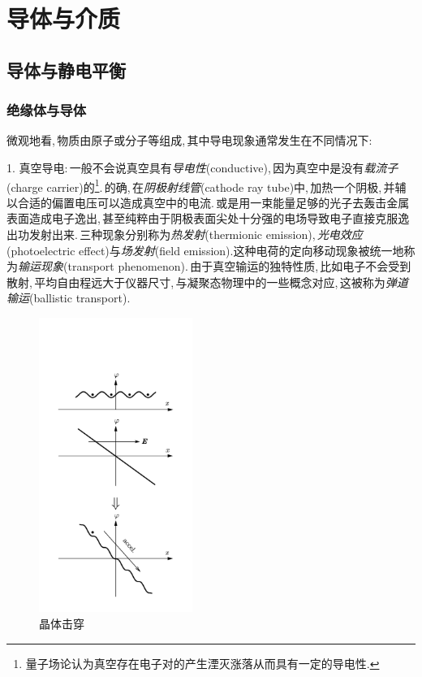 \chapter{导体与介质}




\section{导体与静电平衡}

\subsection{绝缘体与导体}



微观地看,\,物质由原子或分子等组成,\,其中导电现象通常发生在不同情况下:

	\vspace{0.3cm}1. 真空导电:\,一般不会说真空具有\emph{导电性}(conductive),\,因为真空中是没有\emph{载流子}(charge carrier)的\footnote{量子场论认为真空存在电子对的产生湮灭涨落从而具有一定的导电性.}.\,的确,\,在\emph{阴极射线管}(cathode ray tube)中,\,加热一个阴极,\,并辅以合适的偏置电压可以造成真空中的电流.\,或是用一束能量足够的光子去轰击金属表面造成电子逸出,\,甚至纯粹由于阴极表面尖处十分强的电场导致电子直接克服逸出功发射出来.\,三种现象分别称为\emph{热发射}(thermionic emission),\,\emph{光电效应}(photoelectric effect)与\emph{场发射}(field emission).这种电荷的定向移动现象被统一地称为\emph{输运现象}(transport phenomenon).\,由于真空输运的独特性质,\,比如电子不会受到散射,\,平均自由程远大于仪器尺寸,\,与凝聚态物理中的一些概念对应,\,这被称为\emph{弹道输运}(ballistic transport).

	\begin{figure}
	\vspace{-2.2cm}
	\centering
	\includegraphics[width=5cm]{image/7-2-1.png}
	\caption{晶体击穿}
	\end{figure}


